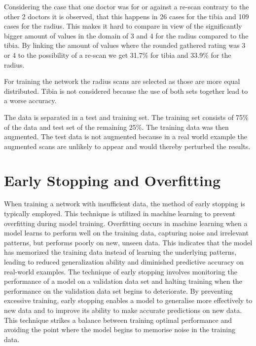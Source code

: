 \documentclass[
a4paper, 
12pt,
grayscalebody, %
abstract=on,
twoside, BCOR10mm, 12pt, DIV13,headinclude, footexclude, final, abstracton, openright
]{ibireprt}
\numberwithin{equation}{chapter}
\numberwithin{table}{chapter}
\numberwithin{figure}{chapter}
\numberwithin{algorithm}{chapter}
\numberwithin{example}{chapter}
\numberwithin{example}{chapter}
\begin{document}
Considering the case that one doctor was for or against a re-scan contrary to the other 2 doctors it is observed, that this happens in 26 cases for the tibia and 109 cases for the radius. This makes it hard to compare in view of the significantly bigger amount of values in the domain of 3 and 4 for the radius compared to the tibia. By linking the amount of values where the rounded gathered rating was 3 or 4 to the possibility of a re-scan we get 31.7\% for tibia and 33.9\% for the radius.  %

For training the network the radius scans are selected as those are more equal distributed. Tibia is not considered because the use of both sets together lead to a worse accuracy.

The data is separated in a test and training set. The training set consists of 75\% of the data and test set of the remaining 25\%. The training data was then augmented. The test data is not augmented because in a real world example the augmented scans are unlikely to appear and would thereby perturbed the results.

\section{Early Stopping and Overfitting}
When training a network with insufficient data, the method of early stopping is typically employed. This technique is utilized in machine learning to prevent overfitting during model training. Overfitting occurs in machine learning when a model learns to perform well on the training data, capturing noise and irrelevant patterns, but performs poorly on new, unseen data. This indicates that the model has memorized the training data instead of learning the underlying patterns, leading to reduced generalization ability and diminished predictive accuracy on real-world examples. The technique of early stopping involves monitoring the performance of a model on a validation data set and halting training when the performance on the validation data set begins to deteriorate. By preventing excessive training, early stopping enables a model to generalise more effectively to new data and to improve its ability to make accurate predictions on new data. This technique strikes a balance between training optimal performance and avoiding the point where the model begins to memorise noise in the training data.
\end{document}
